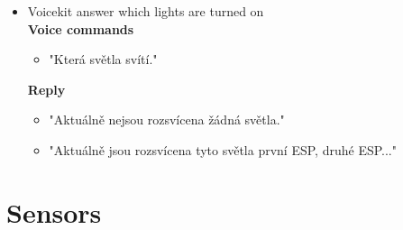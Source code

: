 \begin{itemize}
\begin{itemize}
    \end{itemize}
    \item Voicekit answer which lights are turned on\\
    \textbf{Voice commands}
    \begin{itemize}
        \item "Která světla svítí."
    \end{itemize}
    \textbf{Reply}
    \begin{itemize}
        \item "Aktuálně nejsou rozsvícena žádná světla."
        \item "Aktuálně jsou rozsvícena tyto světla první ESP, druhé ESP..."
    \end{itemize}
\end{itemize}

\section{Sensors}\label{section:app_sensors}

